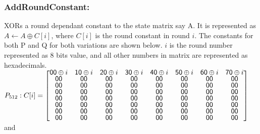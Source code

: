     \subsubsection{AddRoundConstant:} XORs a round dependant constant to the state matrix say A. It is represented as 
    $A \gets A \oplus C[i]$, where $C[i]$ is the round constant in round $i$. The constants for both P and Q for both
    variations are shown below. $i$ is the round number represented as 8 bits value, and all other numbers in matrix
    are represented as hexadecimals.\\

    $ P_{512}: C[i] = \renewcommand\arraystretch{0.75}
    \begin{bmatrix}
      \mathsf{00} \oplus i & \mathsf{10} \oplus i & \mathsf{20} \oplus i & \mathsf{30} \oplus i & \mathsf{40} \oplus i & \mathsf{50} \oplus i & \mathsf{60} \oplus i & \mathsf{70} \oplus i \\
      \mathsf{00} & \mathsf{00} & \mathsf{00} & \mathsf{00} & \mathsf{00} & \mathsf{00} & \mathsf{00} & \mathsf{00} \\
      \mathsf{00} & \mathsf{00} & \mathsf{00} & \mathsf{00} & \mathsf{00} & \mathsf{00} & \mathsf{00} & \mathsf{00} \\
      \mathsf{00} & \mathsf{00} & \mathsf{00} & \mathsf{00} & \mathsf{00} & \mathsf{00} & \mathsf{00} & \mathsf{00} \\
      \mathsf{00} & \mathsf{00} & \mathsf{00} & \mathsf{00} & \mathsf{00} & \mathsf{00} & \mathsf{00} & \mathsf{00} \\
      \mathsf{00} & \mathsf{00} & \mathsf{00} & \mathsf{00} & \mathsf{00} & \mathsf{00} & \mathsf{00} & \mathsf{00} \\
      \mathsf{00} & \mathsf{00} & \mathsf{00} & \mathsf{00} & \mathsf{00} & \mathsf{00} & \mathsf{00} & \mathsf{00} \\
      \mathsf{00} & \mathsf{00} & \mathsf{00} & \mathsf{00} & \mathsf{00} & \mathsf{00} & \mathsf{00} & \mathsf{00} \\
    \end{bmatrix}$ \\

    and 

